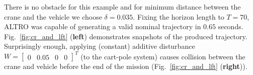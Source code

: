 %
There is no obstacle for this example and for minimum distance between the crane and the vehicle we choose $\delta=0.035$. %
Fixing the horizon length to $T=70$, ALTRO was capable of generating a valid nominal trajectory in $0.65$ seconds. Fig.~\ref{fig:cr_and_lft} (\textbf{left}) demonstrates snapshots of the produced trajectory. Surprisingly enough, applying (constant) additive disturbance $W=\begin{bmatrix}0&0.05&0&0\end{bmatrix}^T$ (to the cart-pole system) causes collision between the crane and vehicle before the end of the mission (Fig.~\ref{fig:cr_and_lft} (\textbf{right})).

